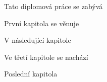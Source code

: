 Tato diplomová práce se zabývá 

První kapitola se věnuje 

V následující kapitole 

Ve třetí kapitole se nachází 

Poslední kapitola 